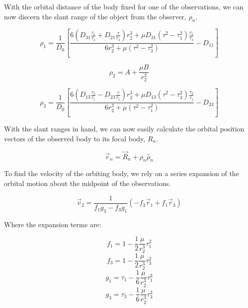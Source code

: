 \documentclass[11pt,twoside,letterpaper]{article}
\begin{document}
  With the orbital distance of the body fixed for one of the
  observations, we can now discern the slant range of the object from
  the observer, $\rho_n$.

  \begin{equation}
    \rho_1 = \frac{1}{D_0}\left[
      \frac{6\left(D_{31}\frac{\tau_1}{\tau_3} + D_{21}\frac{\tau}{\tau_3}\right)r_2^3
        + \mu D_{31}\left(\tau^2 - \tau_1^2\right)\frac{\tau_1}{\tau_3}}{6r_2^3
        + \mu\left(\tau^2 - \tau_3^2\right)} - D_{11}\right]
  \end{equation}

  \begin{equation}
    \rho_2 = A + \frac{\mu B}{r_2^3}
  \end{equation}

  \begin{equation}
    \rho_3 = \frac{1}{D_0}\left[
      \frac{6\left(D_{13}\frac{\tau_3}{\tau_1} - D_{23}\frac{\tau}{\tau_1}\right)r_2^3
        + \mu D_{13}\left(\tau^2 - \tau_3^2\right)\frac{\tau_3}{\tau_1}}{6r_2^3
        + \mu\left(\tau^2 - \tau_1^2\right)} - D_{33}\right]    
  \end{equation}

  With the slant ranges in hand, we can now easily calculate the
  orbital position vectors of the observed body to its focal body,
  $R_n$.

  \begin{equation}
    \vec{r}_n = \vec{R}_n + \rho_n{\hat{\rho}}_n
  \end{equation}

  To find the velocity of the orbiting body, we rely on a series
  expansion of the orbital motion about the midpoint of the
  observations.

  \begin{equation}
    \vec{v}_2 = \frac{1}{f_1g_3 - f_3g_1}\left(-f_3\vec{r}_1 + f_1\vec{r}_3\right)
  \end{equation}

  Where the expansion terms are:

  \begin{equation}
    f_1 = 1 - \frac{1}{2}\frac{\mu}{r_2^3}\tau_1^2
  \end{equation}
  \begin{equation}
    f_3 = 1 - \frac{1}{2}\frac{\mu}{r_2^3}\tau_3^2
  \end{equation}
  \begin{equation}
    g_1 = \tau_1 - \frac{1}{6}\frac{\mu}{r_2^3}\tau_1^3
  \end{equation}
  \begin{equation}    
    g_3 = \tau_3 - \frac{1}{6}\frac{\mu}{r_2^3}\tau_3^3
  \end{equation}
\end{document}
